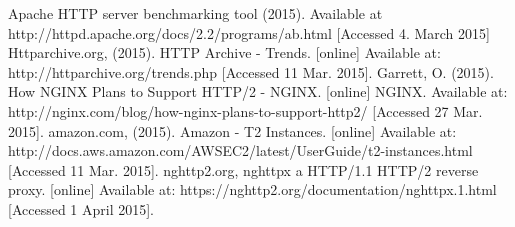 \begin{thebibliography}{99}
 Apache HTTP server benchmarking tool (2015). Available at http://httpd.apache.org/docs/2.2/programs/ab.html [Accessed 4. March 2015]
 Httparchive.org, (2015). HTTP Archive - Trends. [online] Available at: http://httparchive.org/trends.php [Accessed 11 Mar. 2015].
Garrett, O. (2015). How NGINX Plans to Support HTTP/2 - NGINX. [online] NGINX. Available at: http://nginx.com/blog/how-nginx-plans-to-support-http2/ [Accessed 27 Mar. 2015].
 amazon.com, (2015). Amazon - T2 Instances. [online] Available at: http://docs.aws.amazon.com/AWSEC2/latest/UserGuide/t2-instances.html [Accessed 11 Mar. 2015].
 nghttp2.org, nghttpx a HTTP/1.1 HTTP/2 reverse proxy. [online] Available at: https://nghttp2.org/documentation/nghttpx.1.html [Accessed 1 April 2015].
\end{thebibliography}